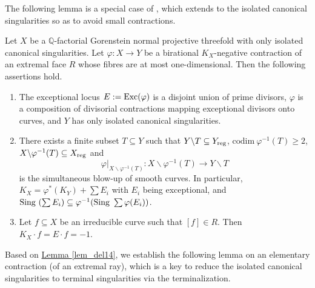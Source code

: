 The following lemma is a special  case of \cite[Theorem 2.2]{Del14},  which extends  \cite[Theorem 4]{Cut88} to the  isolated canonical singularities so as to avoid  small contractions.

\begin{lemme}\label{lem_del14}
Let $X$ be a $\mathbb{Q}$-factorial Gorenstein normal projective threefold with only isolated  canonical singularities. 
Let $\varphi:X\to Y$ be a birational $K_X$-negative contraction  of an extremal face $R$ whose fibres are at most one-dimensional.
Then the following assertions hold.
\begin{enumerate}
\item[(1)] 
The exceptional locus $E:=\textup{Exc}(\varphi)$ is a disjoint union of prime divisors, 
$\varphi$ is a composition of divisorial contractions mapping exceptional divisors onto curves, and $Y$ has only isolated canonical singularities.
\item[(2)] There exists a finite subset $T\subseteq Y$  such that $Y\backslash T\subseteq Y_{\textup{reg}}$,  $\text{codim}~\varphi^{-1}(T)\ge 2$, $X\backslash \varphi^{-1}(T)\subseteq X_{\textup{reg}}$ and 
$$\varphi|_{X\backslash\varphi^{-1}(T)}:X\backslash \varphi^{-1}(T)\to Y\backslash T$$
is the simultaneous blow-up of   smooth curves.
In particular, $K_X=\varphi^*(K_Y)+\sum E_i$ with $E_i$ being exceptional, and $\textup{Sing}~(\sum E_i)\subseteq \varphi^{-1}(\textup{Sing}~\sum\varphi(E_i))$.
\item[(3)] Let $f\subseteq X$ be an irreducible curve such that $[f]\in R$. Then
$K_X\cdot f=E\cdot f=-1$.
\end{enumerate}
\end{lemme}

Based on {\hyperref[lem_del14]{Lemma  \ref*{lem_del14}}}, we establish the following lemma on an elementary contraction (of an extremal ray), which is a key to reduce the isolated canonical singularities to terminal singularities via the terminalization.

